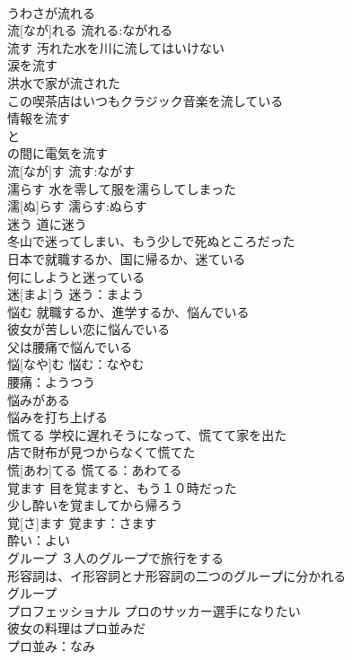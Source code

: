 \documentclass[8pt]{extreport}
\begin{document}
\begin{CJK}{UTF8}{min}
\\	うわさが流れる 
\\	流[なが]れる			流れる:ながれる
\\	流す	汚れた水を川に流してはいけない 
\\	涙を流す 
\\	洪水で家が流された 
\\	この喫茶店はいつもクラジック音楽を流している 
\\	情報を流す 
\\	と
\\	の間に電気を流す 
\\	流[なが]す			流す:ながす
\\	濡らす	水を零して服を濡らしてしまった 
\\	濡[ぬ]らす			濡らす:ぬらす
\\	迷う	道に迷う 
\\	冬山で迷ってしまい、もう少しで死ぬところだった 
\\	日本で就職するか、国に帰るか、迷ている 
\\	何にしようと迷っている 
\\	迷[まよ]う			迷う：まよう
\\	悩む	就職するか、進学するか、悩んでいる 
\\	彼女が苦しい恋に悩んでいる 
\\	父は腰痛で悩んでいる 
\\	悩[なや]む			悩む：なやむ
\\	腰痛：ようつう
\\	悩みがある 
\\	悩みを打ち上げる 
\\	慌てる	学校に遅れそうになって、慌てて家を出た 
\\	店で財布が見つからなくて慌てた 
\\	慌[あわ]てる			慌てる：あわてる
\\	覚ます	目を覚ますと、もう１０時だった 
\\	少し酔いを覚ましてから帰ろう 
\\	覚[さ]ます			覚ます：さます
\\	酔い：よい
\\	グループ	３人のグループで旅行をする 
\\	形容詞は、イ形容詞とナ形容詞の二つのグループに分かれる 
\\	グループ			
\\	プロフェッショナル	プロのサッカー選手になりたい 
\\	彼女の料理はプロ並みだ 
\\	プロ並み：なみ

\end{CJK}
\end{document}
